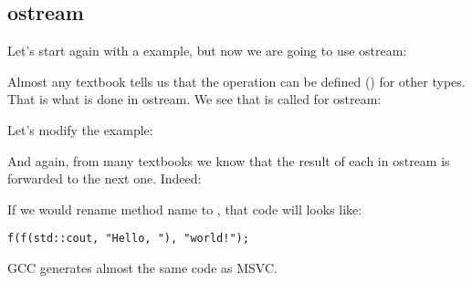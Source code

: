 \subsection{ostream}

Let's start again with a  example, but now we are going to use ostream:



Almost any \Cpp textbook tells us that the \TT{<<} operation can be defined ()
for other types.
That is what is done in ostream.
We see that  is called for ostream:



Let's modify the example:



And again, from many \Cpp textbooks we know that the result of each  in ostream is forwarded to the
next one.
Indeed:



If we would rename  method name to \ttf{}, that code will looks like:

\begin{lstlisting}
f(f(std::cout, "Hello, "), "world!");
\end{lstlisting}

GCC generates almost the same code as MSVC.

